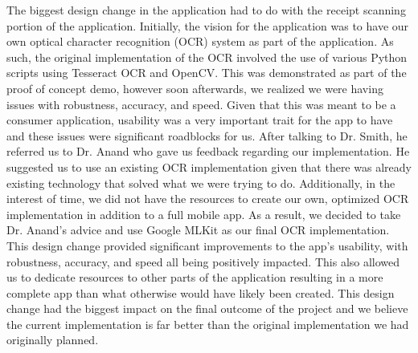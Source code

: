 \documentclass{article}
\begin{document}

The biggest design change in the application had to do with the receipt scanning portion of the
application. Initially, the vision for the application was to have our own optical character recognition (OCR)
system as part of the application. As such, the original implementation of the OCR involved the use
of various Python scripts using Tesseract OCR and OpenCV. This was demonstrated as part of the proof of concept demo,
however soon afterwards, we realized we were having issues with robustness, accuracy, and speed. Given that this
was meant to be a consumer application, usability was a very important trait for the app to have and these issues
were significant roadblocks for us. After talking to Dr. Smith, he referred us to Dr. Anand who gave us
feedback regarding our implementation. He suggested us to use an existing OCR implementation given
that there was already existing technology that solved what we were trying to do. Additionally, in the interest of time,
we did not have the resources to create our own, optimized OCR implementation in addition to a full
mobile app. As a result, we decided to take Dr. Anand's advice and use Google MLKit as our final OCR implementation. This
design change provided significant improvements to the app's usability, with robustness, accuracy, and speed all being
positively impacted. This also allowed us to dedicate resources to other parts of the application resulting in a
more complete app than what otherwise would have likely been created. This design change had the biggest impact on
the final outcome of the project and we believe the current implementation is far better than the original implementation
we had originally planned.
\end{document}
